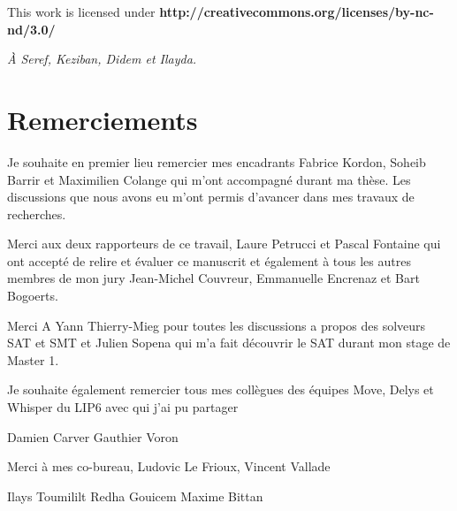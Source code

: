 \clearpage\null\vfill
\thispagestyle{empty}
\begin{minipage}[b]{.9\textwidth}
  \begin{center}
  \setlength{\parskip}{.5\baselineskip}
  {\color{phdcol0}%
   \ccLogo\hspace{.1cm}%
   \ccAttribution\hspace{.1cm}%
   \ccNonCommercial\hspace{.1cm}%
   \ccNoDerivatives}\hspace{.15cm}%
  \footnotesize%
  This work is licensed under {\color{phdcol1}\textbf{http://creativecommons.org/licenses/by-nc-nd/3.0/}}
  \end{center}
\end{minipage}
\vspace*{2\baselineskip}
\clearpage
\thispagestyle{empty}
\begin{flushright}
  \textit{À Seref, Keziban, Didem et Ilayda.}
\end{flushright}
%

\chapter*{Remerciements}

Je souhaite en premier lieu remercier mes encadrants Fabrice Kordon, 
Soheib Barrir et Maximilien Colange qui m'ont accompagné durant ma thèse.
Les discussions que nous avons eu m'ont permis d'avancer dans mes travaux de recherches.

Merci aux deux rapporteurs de ce travail, 
Laure Petrucci et Pascal Fontaine qui ont accepté de relire et évaluer ce manuscrit et également à 
tous les autres membres de mon jury Jean-Michel Couvreur, Emmanuelle Encrenaz et Bart Bogoerts.


Merci A Yann Thierry-Mieg pour toutes les discussions a propos des solveurs SAT et SMT et 
Julien Sopena  qui m'a fait découvrir le SAT durant mon stage de Master 1.


Je souhaite également remercier tous mes collègues des équipes Move, Delys et Whisper du LIP6 avec qui j'ai
pu partager 



Damien Carver
Gauthier Voron

Merci à mes co-bureau, Ludovic Le Frioux, Vincent Vallade 

Ilays Toumililt
Redha Gouicem
Maxime Bittan

